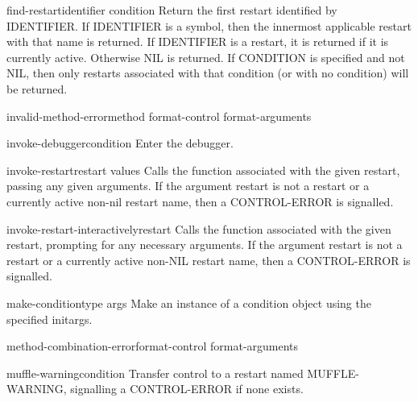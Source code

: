 \begin{function}{find-restart}{identifier \op condition}{}{}
  Return the first restart identified by IDENTIFIER. If IDENTIFIER is a symbol,
then the innermost applicable restart with that name is returned. If IDENTIFIER
is a restart, it is returned if it is currently active. Otherwise NIL is
returned. If CONDITION is specified and not NIL, then only restarts associated
with that condition (or with no condition) will be returned.
\end{function}

\begin{function}{invalid-method-error}{method format-control \rest format-arguments}{}{}
  
\end{function}

\begin{function}{invoke-debugger}{condition}{}{}
  Enter the debugger.
\end{function}

\begin{function}{invoke-restart}{restart \rest values}{}{}
  Calls the function associated with the given restart, passing any given
   arguments. If the argument restart is not a restart or a currently active
   non-nil restart name, then a CONTROL-ERROR is signalled.
\end{function}

\begin{function}{invoke-restart-interactively}{restart}{}{}
  Calls the function associated with the given restart, prompting for any
   necessary arguments. If the argument restart is not a restart or a
   currently active non-NIL restart name, then a CONTROL-ERROR is signalled.
\end{function}

\begin{function}{make-condition}{type \rest args}{}{}
  Make an instance of a condition object using the specified initargs.
\end{function}

\begin{function}{method-combination-error}{format-control \rest format-arguments}{}{}
  
\end{function}

\begin{function}{muffle-warning}{\op condition}{}{}
  Transfer control to a restart named MUFFLE-WARNING, signalling a
   CONTROL-ERROR if none exists.
\end{function}

